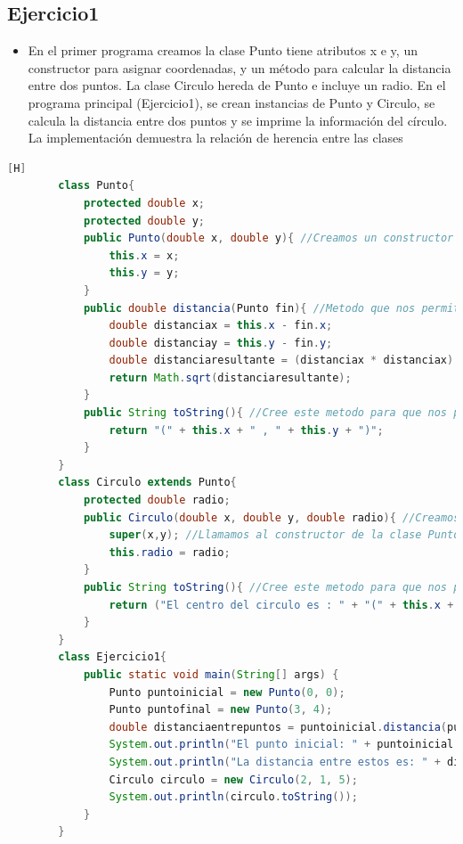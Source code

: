 \documentclass{article}
\begin{document}
	\subsection{Ejercicio1}
	\begin{itemize}	
		\item En el primer programa creamos la clase Punto tiene atributos x e y, un constructor para asignar coordenadas, y un método para calcular la distancia entre dos puntos. La clase Circulo hereda de Punto e incluye un radio. En el programa principal (Ejercicio1), se crean instancias de Punto y Circulo, se calcula la distancia entre dos puntos y se imprime la información del círculo. La implementación demuestra la relación de herencia entre las clases
	\end{itemize}	
	\begin{lstlisting}[language=java,caption={Las lineas de codigos del metodo creado:}][H]
		class Punto{
			protected double x;
			protected double y;
			public Punto(double x, double y){ //Creamos un constructor para asiganar valores a los atributos de la clase Punto el cual nos podra asignar puntos como para un centro de nuestra figura o de un punti cualquiera
				this.x = x;
				this.y = y;
			}
			public double distancia(Punto fin){ //Metodo que nos permite ver la distancia entre puntos o hallar la distancia de un centro de nuestra figura hacia un punto 
				double distanciax = this.x - fin.x;
				double distanciay = this.y - fin.y;
				double distanciaresultante = (distanciax * distanciax) + (distanciay * distanciay);
				return Math.sqrt(distanciaresultante);
			}
			public String toString(){ //Cree este metodo para que nos puedra mostrar los puntos que estamos calculando
				return "(" + this.x + " , " + this.y + ")";
			}
		}
		class Circulo extends Punto{
			protected double radio;
			public Circulo(double x, double y, double radio){ //Creamos este constructor el cual nos va a establecer las coordenadas que necesitamos como su centro y asignamos el valor del radio de este
				super(x,y); //Llamamos al constructor de la clase Punto ,la cual seria nuestro centro del circulo de lo cual heredamos de la clase Punto 
				this.radio = radio; 
			}
			public String toString(){ //Cree este metodo para que nos puedra mostrar las propiedades de este como su centro y su radio
				return ("El centro del circulo es : " + "(" + this.x + " , " + this.y + ")" + " y su radio es : " + this.radio);
			}
		}
		class Ejercicio1{
			public static void main(String[] args) {
				Punto puntoinicial = new Punto(0, 0);
				Punto puntofinal = new Punto(3, 4);
				double distanciaentrepuntos = puntoinicial.distancia(puntofinal);
				System.out.println("El punto inicial: " + puntoinicial.toString() + " y el punto final: " + puntofinal.toString());
				System.out.println("La distancia entre estos es: " + distanciaentrepuntos);
				Circulo circulo = new Circulo(2, 1, 5);
				System.out.println(circulo.toString());
			}
		}
	\end{lstlisting}
\end{document}
